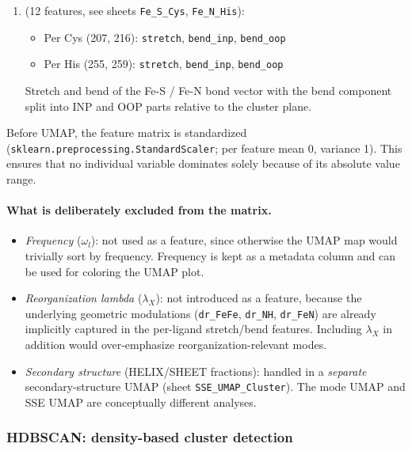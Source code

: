 \documentclass[11pt,a4paper,twoside]{article}
\theoremstyle{remark}
\begin{document}
\begin{enumerate}
  \item[\textbf{Per-ligand atom motions}] (12 features, see
        sheets \texttt{Fe\_S\_Cys}, \texttt{Fe\_N\_His}):
        \begin{itemize}\setlength{\itemsep}{0pt}
          \item Per Cys (207, 216): \texttt{stretch},
                \texttt{bend\_inp}, \texttt{bend\_oop}
          \item Per His (255, 259): \texttt{stretch},
                \texttt{bend\_inp}, \texttt{bend\_oop}
        \end{itemize}
        Stretch and bend of the Fe-S / Fe-N bond vector with
        the bend component split into INP and OOP parts relative
        to the cluster plane.
\end{enumerate}

Before UMAP, the feature matrix is standardized
(\texttt{sklearn.preprocessing.StandardScaler}; per feature mean
0, variance 1). This ensures that no individual variable dominates
solely because of its absolute value range.

\paragraph{What is deliberately excluded from the matrix.}

\begin{itemize}
  \item \emph{Frequency} ($\omega_l$): not used as a feature,
        since otherwise the UMAP map would trivially sort by
        frequency. Frequency is kept as a metadata column and can
        be used for coloring the UMAP plot.

  \item \emph{Reorganization lambda} ($\lambda_X$): not introduced
        as a feature, because the underlying geometric modulations
        (\texttt{dr\_FeFe}, \texttt{dr\_NH}, \texttt{dr\_FeN})
        are already implicitly captured in the per-ligand
        stretch/bend features. Including $\lambda_X$ in addition
        would over-emphasize reorganization-relevant modes.

  \item \emph{Secondary structure} (HELIX/SHEET fractions): handled
        in a \emph{separate} secondary-structure UMAP (sheet
        \texttt{SSE\_UMAP\_Cluster}). The mode UMAP and SSE UMAP
        are conceptually different analyses.
\end{itemize}

\subsubsection*{HDBSCAN: density-based cluster detection}
\end{document}
